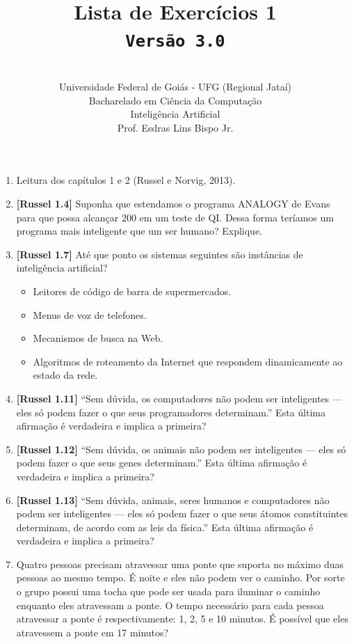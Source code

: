 \documentclass[12pt,a4paper,oneside]{article}
\author{\\Universidade Federal de Goiás - UFG (Regional Jataí) \\Bacharelado em Ciência da Computação \\Inteligência Artificial \\Prof. Esdras Lins Bispo Jr.}
\title{
	{\sc \huge Lista de Exercícios 1} 
	\\{\tt Versão 3.0}
}
\begin{document}
\maketitle

\begin{enumerate}

	\item Leitura dos capítulos 1 e 2 (Russel e Norvig, 2013).
	
	\item {\bf [Russel 1.4]} Suponha que estendamos o programa ANALOGY de Evans para que possa alcançar 200 em um
teste de QI. Dessa forma teríamos um programa mais inteligente que um ser humano? Explique.	

	\item {\bf [Russel 1.7]} Até que ponto os sistemas seguintes são instâncias de inteligência artificial?
 		\begin{itemize}
 			\item Leitores de código de barra de supermercados.
			\item Menus de voz de telefones.
			\item Mecanismos de busca na Web.
			\item Algoritmos de roteamento da Internet que respondem dinamicamente ao estado da rede.
		\end{itemize}
	
	\item {\bf [Russel 1.11]} ``Sem dúvida, os computadores não podem ser inteligentes — eles só podem fazer o que seus programadores determinam.'' Esta última afirmação é verdadeira e implica a primeira?
	
	\item {\bf [Russel 1.12]} ``Sem dúvida, os animais não podem ser inteligentes — eles só podem fazer o que seus genes determinam.'' Esta última afirmação é verdadeira e implica a primeira?
	
	\item {\bf [Russel 1.13]} ``Sem dúvida, animais, seres humanos e computadores não podem ser inteligentes — eles só podem fazer o que seus átomos constituintes determinam, de acordo com as leis da física.'' Esta
última afirmação é verdadeira e implica a primeira?	

	\item Quatro pessoas precisam atravessar uma ponte que suporta no máximo duas pessoas ao mesmo tempo. É noite e eles não podem ver o caminho. Por sorte o grupo possui uma tocha que pode ser usada para iluminar o caminho enquanto eles atravessam a ponte. O tempo necessário para cada pessoa atravessar a ponte é respectivamente: 1, 2, 5 e 10 minutos. É possível que eles atravessem a ponte em 17 minutos?
	

\end{enumerate}
\end{document}
